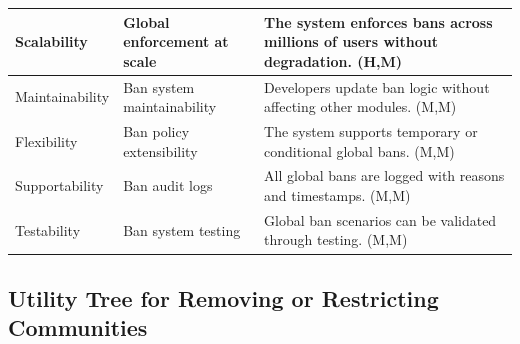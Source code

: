 \documentclass{article}
\begin{document}
\begin{table}[H]
\begin{tabular}{|p{3cm}|p{4cm}|p{7cm}|}
        Scalability
                                   & Global enforcement at scale
                                   & The system enforces bans across millions of users without degradation. (H,M)                                    \\
        \hline

        Maintainability
                                   & Ban system maintainability
                                   & Developers update ban logic without affecting other modules. (M,M)                                              \\
        \hline

        Flexibility
                                   & Ban policy extensibility
                                   & The system supports temporary or conditional global bans. (M,M)                                                 \\
        \hline

        Supportability
                                   & Ban audit logs
                                   & All global bans are logged with reasons and timestamps. (M,M)                                                   \\
        \hline

        Testability
                                   & Ban system testing
                                   & Global ban scenarios can be validated through testing. (M,M)                                                    \\
        \hline
    \end{tabular}
\end{table}

\subsection{Utility Tree for Removing or Restricting Communities}
\end{document}
